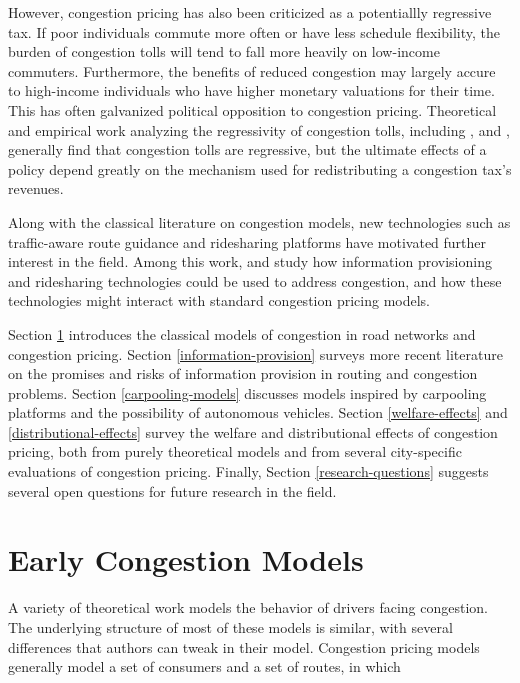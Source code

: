 \documentclass[JEL]{AEA}
\begin{document}
However, congestion pricing has also been criticized as a potentiallly regressive tax. If poor individuals commute more often or have less schedule flexibility, the burden of congestion tolls will tend to fall more heavily on low-income commuters. Furthermore, the benefits of reduced congestion may largely accure to high-income individuals who have higher monetary valuations for their time. This has often galvanized political opposition to congestion pricing. Theoretical and empirical work analyzing the regressivity of congestion tolls, including \cite{arnott-1994}, \cite{small-1983} and \cite{eliasson-2006}, generally find that congestion tolls are regressive, but the ultimate effects of a policy depend greatly on the mechanism used for redistributing a congestion tax's revenues.

Along with the classical literature on congestion models, new technologies such as traffic-aware route guidance and ridesharing platforms have motivated further interest in the field. Among this work, \cite{das-2017} and \cite{ostrovsky-2018} study how information provisioning and ridesharing technologies could be used to address congestion, and how these technologies might interact with standard congestion pricing models.

Section \ref{early-congestion-models} introduces the classical models of congestion in road networks and congestion pricing. Section \ref{information-provision} surveys more recent literature on the promises and risks of information provision in routing and congestion problems. Section \ref{carpooling-models} discusses models inspired by carpooling platforms and the possibility of autonomous vehicles. Section \ref{welfare-effects} and \ref{distributional-effects} survey the welfare and distributional effects of congestion pricing, both from purely theoretical models and from several city-specific evaluations of congestion pricing. Finally, Section \ref{research-questions} suggests several open questions for future research in the field.

\section{Early Congestion Models}
\label{early-congestion-models}

A variety of theoretical work models the behavior of drivers facing congestion. The underlying structure of most of these models is similar, with several differences that authors can tweak in their model. Congestion pricing models generally model a set of consumers and a set of routes, in which 
\end{document}
